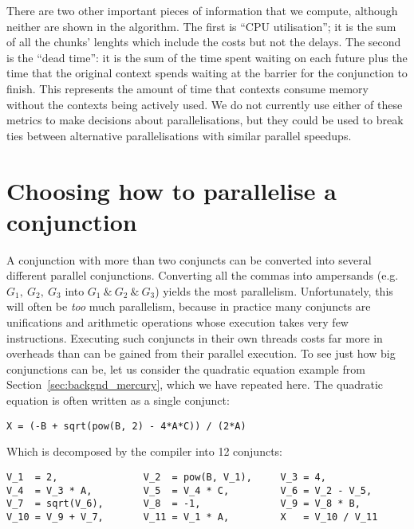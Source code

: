 There are two other important pieces of information that we compute,
although neither are shown in the algorithm.
The first is ``CPU utilisation'';
it is the sum of all the chunks' lenghts which include the costs but not the
delays.
The second is the ``dead time'':
it is the sum of the time spent waiting on each future plus the time that
the original context spends waiting at the barrier for the conjunction to
finish.
This represents the amount of time that contexts consume memory without
the contexts being actively used.
We do not currently use either of these metrics to make decisions about
parallelisations,
but they could be used to break ties between alternative parallelisations
with similar parallel speedups.


\section{Choosing how to parallelise a conjunction}
\label{sec:overlap_howto}


A conjunction with more than two conjuncts can be converted into several
different parallel conjunctions.
Converting all the commas into ampersands
(e.g.\ $G_1,~G_2,~G_3$ into $G_1~\&~G_2~\&~G_3$)
yields the most parallelism.
Unfortunately, this will often be \emph{too} much parallelism,
because in practice many conjuncts are unifications
and arithmetic operations whose execution takes very few instructions.
Executing such conjuncts in their own threads
costs far more in overheads than can be gained from their parallel execution.
To see just how big conjunctions can be,
let us consider the quadratic equation example
from Section~\ref{sec:backgnd_mercury},
which we have repeated here.
The quadratic equation is often written as a single conjunct:

\begin{verbatim}
X = (-B + sqrt(pow(B, 2) - 4*A*C)) / (2*A)
\end{verbatim}

\noindent
Which is decomposed by the compiler into 12 conjuncts:

\begin{verbatim}
V_1  = 2,               V_2  = pow(B, V_1),     V_3 = 4,
V_4  = V_3 * A,         V_5  = V_4 * C,         V_6 = V_2 - V_5,
V_7  = sqrt(V_6),       V_8  = -1,              V_9 = V_8 * B,
V_10 = V_9 + V_7,       V_11 = V_1 * A,         X   = V_10 / V_11
\end{verbatim}

